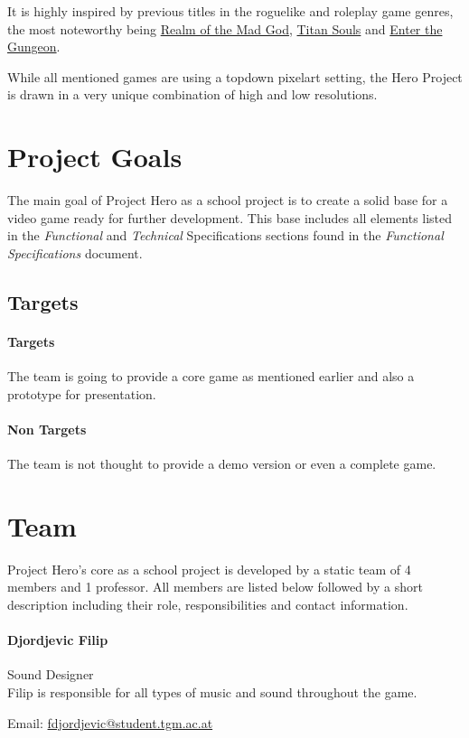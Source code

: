 \documentclass[11pt]{article}
\begin{document}
It is highly inspired by previous titles in the roguelike and roleplay game genres, the most noteworthy being \href{https://realmofthemadgod.com}{Realm of the Mad God}, \href{http://www.devolverdigital.com/games/view/titan-souls}{Titan Souls} and \href{http://dodgeroll.com/gungeon/}{Enter the Gungeon}.

While all mentioned games are using a topdown pixelart setting, the Hero Project is drawn in a very unique combination of high and low resolutions.

\section{Project Goals}
The main goal of Project Hero as a school project is to create a solid base for a video game ready for further development.
This base includes all elements listed in the \textit{Functional} and \textit{Technical} Specifications sections found in the \textit{Functional Specifications} document.

\subsection{Targets}
\paragraph{Targets}
The team is going to provide a core game as mentioned earlier and also a prototype for presentation.
\paragraph{Non Targets}
The team is not thought to provide a demo version or even a complete game.

\newpage

\section{Team}
Project Hero's core as a school project is developed by a static team of 4 members and 1 professor. All members are listed below followed by a short description including their role, responsibilities and contact information.
\paragraph{Djordjevic Filip} Sound Designer\\
Filip is responsible for all types of music and sound throughout the game.
\begin{description}
 \item Email: \href{mailto:fdjordjevic@student.tgm.ac.at}{fdjordjevic@student.tgm.ac.at}
\end{description}
\end{document}
